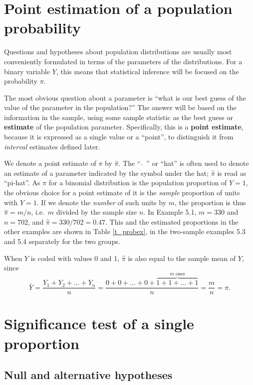 \section{Point estimation of a population probability}
\label{s_probs_pointest}

Questions and hypotheses about population distributions are usually most
conveniently formulated in terms of the parameters of the distributions.
For a binary variable $Y$, this means that statistical inference will be
focused on the probability $\pi$.

The most obvious question about a parameter is ``what is our
best guess of the value of the parameter in the population?'' The answer
will be based on the information in the sample, using some sample
statistic as the best guess or \textbf{estimate} of the population
parameter. Specifically, this is a \textbf{point estimate}, because it
is expressed as a single value or a ``point'', to distinguish it from
\emph{interval} estimates defined later.

We denote a point estimate of $\pi$ by $\hat{\pi}$. The ``$\; \hat{\;}
\; $'' or ``hat'' is often used to denote an estimate of a
parameter indicated by the symbol under the hat; $\hat{\pi}$ is read as
``pi-hat''. As $\pi$ for a binomial distribution is the population
proportion of $Y=1$, the obvious choice for a point estimate of it is
the \emph{sample} proportion of units with $Y=1$. If we denote the
\emph{number} of such units by $m$, the proportion is thus
$\hat{\pi}=m/n$, i.e.\ $m$ divided by the sample size $n$. In Example
5.1, $m=330$ and $n=702$, and $\hat{\pi}=330/702=0.47$. This and the
estimated proportions in the other examples are shown in Table
\ref{t_probex}, in the two-sample examples 5.3 and 5.4 separately for
the two groups.

When $Y$ is coded with values 0 and 1, $\hat{\pi}$ is also equal to the
sample mean of $Y$, since
\begin{equation}
\bar{Y}=\frac{Y_{1}+Y_{2}+\dots+Y_{n}}{n}=
\frac{0+0+\dots+0+\overbrace{1+1+\dots+1}^{m \text{ ones}}}{n}=
\frac{m}{n}=\hat{\pi}.
\label{pihat_as_ybar}
\end{equation}

\section{Significance test of a single proportion}
\label{s_probs_test1sample}

\subsection{Null and alternative hypotheses}
\label{ss-probs-test1sample-hypotheses}

